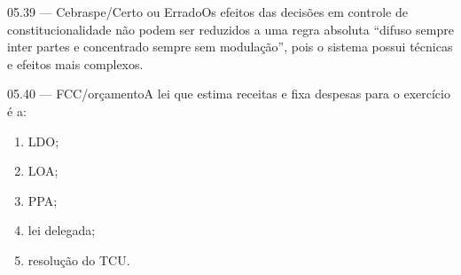 \begin{questao}{ 05.39 — Cebraspe/Certo ou Errado}Os efeitos das decisões em controle de constitucionalidade não podem ser reduzidos a uma regra absoluta ``difuso sempre inter partes e concentrado sempre sem modulação'', pois o sistema possui técnicas e efeitos mais complexos.\end{questao}
\begin{questao}{ 05.40 — FCC/orçamento}A lei que estima receitas e fixa despesas para o exercício é a:\begin{enumerate}[label=\Alph*)]\item LDO;\item LOA;\item PPA;\item lei delegada;\item resolução do TCU.\end{enumerate}\end{questao}

